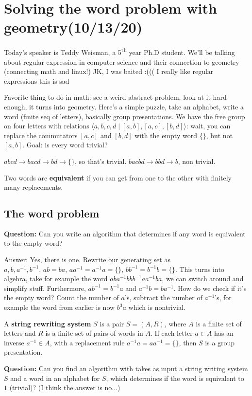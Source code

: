 \section{Solving the word problem with geometry(10/13/20)}
Today's speaker is Teddy Weisman, a 5\textsuperscript{th} year Ph.D student. We'll be talking about regular expression in computer science and their connection to geometry (connecting math and linux!) JK, I was baited :((( I really like regular expressions this is sad

Favorite thing to do in math: see a weird abstract problem, look at it hard enough, it turns into geometry.
\orbreak
Here's a simple puzzle, take an alphabet, write a word (finite seq of letters), basically group presentations. We have the free group on four letters with relations $\langle a,b,c,d \mid [a,b],[a,c],[b,d] \rangle $: wait, you can replace the commutators $[a,c]$ and $[b,d]$ with the empty word $\{\} $, but not $[a,b]$. Goal: is every word trivial? 
\begin{example}
    $abcd\to bacd\to bd\to \{\} $, so that's trivial. $bac bd\to bbd \to b$, non trivial.
\end{example}
\begin{definition}[]
    Two words are \textbf{equivalent} if you can get from one to the other with finitely many replacements.
\end{definition}
\subsection{The word problem}
\textbf{Question:} Can you write an algorithm that determines if any word is equivalent to the empty word? 

Answer: Yes, there is one. Rewrite our generating set as $a,b,a^{-1},b^{-1},\,ab=ba,\,aa^{-1}=a^{-1}a=\{\} ,\,bb^{-1}=b^{-1}b=\{\} $. This turns into algebra, take for example the word $aba^{-1}bbb^{-1}aa^{-1}ba$, we can switch around and simplify stuff. Furthermore, $ab^{-1}=b^{-1}a$ and $a^{-1}b=ba^{-1}$. How do we check if it's the empty word? Count the number of $a$'s, subtract the number of $a^{-1}$'s, for example the word from earlier is now $b^3a$ which is nontrivial.
\orbreak
\begin{definition}[]
    A \textbf{string rewriting system} $S$ is a pair $S=(A,R)$, where $A$ is a finite set of letters and $R$ is a finite set of pairs of words in $A$. If each letter $a\in A$ has an inverse $a^{-1}\in A$, with a replacement rule $a^{-1}a=aa^{-1}=\{\} $, then $S$ is a group presentation.
\end{definition}
\textbf{Question:} Can you find an algorithm with takes as input a string writing system $S$ and a word in an alphabet for $S$, which determines if the word is equivalent to $1$ (trivial)? (I think the answer is no...)

